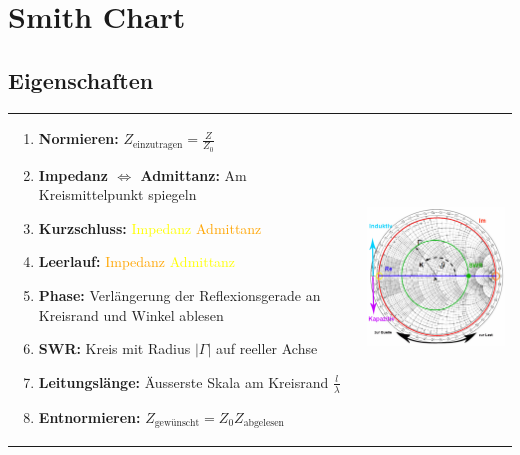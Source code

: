 
\section{Smith Chart}
\subsection{Eigenschaften}
	\begin{tabular}{p{10cm}p{8cm}}
		\begin{minipage}{10cm}
        	\begin{enumerate}{\setlength{\itemsep}{0cm}\setlength{\parsep}{0cm} \setlength{\topsep}{0cm}}
              \item \textbf{Normieren:} $Z_{\text{einzutragen}} = \frac{Z}{Z_0}$
              \item \textbf{Impedanz $\Leftrightarrow$ Admittanz:} Am Kreismittelpunkt spiegeln
              \item \textbf{Kurzschluss:} 	\textcolor{yellow}{Impedanz} \textcolor{orange}{Admittanz}
              \item \textbf{Leerlauf:}		\textcolor{orange}{Impedanz} \textcolor{yellow}{Admittanz}
        	  \item \textbf{Phase:}	Verlängerung der Reflexionsgerade an Kreisrand und Winkel ablesen
        	  \item \textbf{SWR:} Kreis mit Radius $|\Gamma|$ auf reeller Achse
        	  \item \textbf{Leitungslänge:} Äusserste Skala am Kreisrand  $\frac{l}{\lambda}$
        	  \item \textbf{Entnormieren:} $Z_{\text{gewünscht}} = Z_0
        	  Z_{\text{abgelesen}}$
            \end{enumerate}
        \end{minipage} &
		\begin{minipage}{8cm}
        	\includegraphics[height=7cm]{./images/SmithChart2.png}
        \end{minipage}
	\end{tabular}
